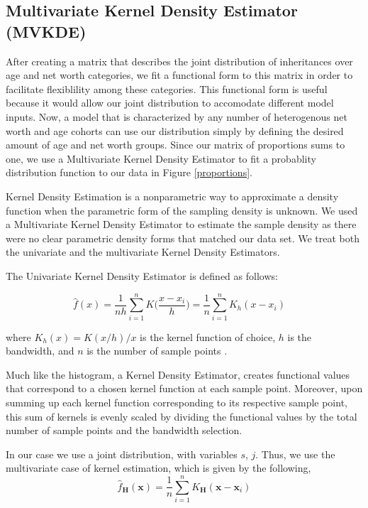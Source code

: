 \documentclass[letterpaper,12pt]{article}
\theoremstyle{definition}
\begin{document}
\begin{spacing}{1.5}
  \subsection{Multivariate Kernel Density Estimator (MVKDE)}\label{SecDistMVKDE}


    After creating a matrix that describes the joint distribution of inheritances over age and net worth categories, we fit a functional form to this matrix in order to facilitate flexiblility among these categories. This functional form is useful because it would allow our joint distribution to accomodate different model inputs. Now, a model that is characterized by any number of heterogenous net worth and age cohorts can use our distribution simply by defining the desired amount of age and net worth groups. Since our matrix of proportions sums to one, we use a Multivariate Kernel Density Estimator to fit a probablity distribution function to our data in Figure \ref{proportions}.


    Kernel Density Estimation is a nonparametric way to approximate a density function when the parametric form of the sampling density is unknown. We used a Multivariate Kernel Density Estimator to estimate the sample density as there were no clear parametric density forms that matched our data set. We treat both the univariate and the multivariate Kernel Density Estimators.
    
    The Univariate Kernel Density Estimator is defined as follows:

    \[\hat{f}(x) = \frac{1}{nh} \sum_{i=1}^n K\Big(\frac{x-x_i}{h}\Big)= \frac{1}{n}\sum_{i=1}^n K_h (x - x_i) \quad \]

    where $K_h(x) =  K(x/h)/x$ is the kernel function of choice, $h$ is the bandwidth, and $n$ is the number of sample points \citet{Scott:2015}. 

    Much like the histogram, a Kernel Density Estimator, creates functional values that correspond to a chosen kernel function at each sample point. Moreover, upon summing up each kernel function corresponding to its respective sample point, this sum of kernels is evenly scaled by dividing the functional values by the total number of sample points and the bandwidth selection.

    In our case we use a joint distribution, with variables $s$, $j$. Thus, we use the multivariate case of kernel estimation, which is given by the following,
    \[\hat{f}_\mathbf{H}(\mathbf{x})= \frac1n \sum_{i=1}^n K_\mathbf{H} (\mathbf{x} - \mathbf{x}_i)\]


\end{spacing}
\end{document}
